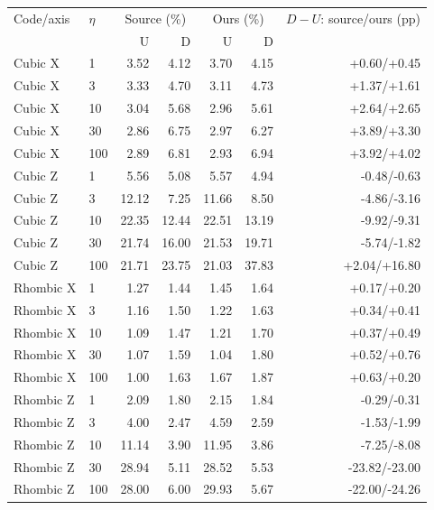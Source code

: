 \begin{longtable}{llrrrrr}
\toprule Code/axis & $\eta$ & \multicolumn{2}{c}{Source (\%)} & \multicolumn{2}{c}{Ours (\%)} & $D-U$: source/ours (pp)\\
 & & U & D & U & D & \\\midrule\endhead
Cubic X & 1 & 3.52 & 4.12 & 3.70 & 4.15 & +0.60/+0.45\\
Cubic X & 3 & 3.33 & 4.70 & 3.11 & 4.73 & +1.37/+1.61\\
Cubic X & 10 & 3.04 & 5.68 & 2.96 & 5.61 & +2.64/+2.65\\
Cubic X & 30 & 2.86 & 6.75 & 2.97 & 6.27 & +3.89/+3.30\\
Cubic X & 100 & 2.89 & 6.81 & 2.93 & 6.94 & +3.92/+4.02\\
Cubic Z & 1 & 5.56 & 5.08 & 5.57 & 4.94 & -0.48/-0.63\\
Cubic Z & 3 & 12.12 & 7.25 & 11.66 & 8.50 & -4.86/-3.16\\
Cubic Z & 10 & 22.35 & 12.44 & 22.51 & 13.19 & -9.92/-9.31\\
Cubic Z & 30 & 21.74 & 16.00 & 21.53 & 19.71 & -5.74/-1.82\\
Cubic Z & 100 & 21.71 & 23.75 & 21.03 & 37.83 & +2.04/+16.80\\
Rhombic X & 1 & 1.27 & 1.44 & 1.45 & 1.64 & +0.17/+0.20\\
Rhombic X & 3 & 1.16 & 1.50 & 1.22 & 1.63 & +0.34/+0.41\\
Rhombic X & 10 & 1.09 & 1.47 & 1.21 & 1.70 & +0.37/+0.49\\
Rhombic X & 30 & 1.07 & 1.59 & 1.04 & 1.80 & +0.52/+0.76\\
Rhombic X & 100 & 1.00 & 1.63 & 1.67 & 1.87 & +0.63/+0.20\\
Rhombic Z & 1 & 2.09 & 1.80 & 2.15 & 1.84 & -0.29/-0.31\\
Rhombic Z & 3 & 4.00 & 2.47 & 4.59 & 2.59 & -1.53/-1.99\\
Rhombic Z & 10 & 11.14 & 3.90 & 11.95 & 3.86 & -7.25/-8.08\\
Rhombic Z & 30 & 28.94 & 5.11 & 28.52 & 5.53 & -23.82/-23.00\\
Rhombic Z & 100 & 28.00 & 6.00 & 29.93 & 5.67 & -22.00/-24.26\\
\bottomrule\end{longtable}

